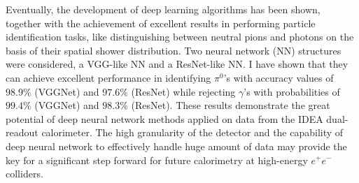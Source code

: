 Eventually, the development of deep learning algorithms has been shown, together with the achievement of excellent results in performing particle identification tasks, like distinguishing between neutral pions and photons on the basis of their spatial shower distribution.
Two neural network (NN) structures were considered, a VGG-like NN and a ResNet-like NN. I have shown that they can achieve excellent performance in identifying $\pi^0$'s with accuracy values of $98.9\%$ (VGGNet) and $97.6\%$ (ResNet) while rejecting $\gamma$'s with probabilities of $99.4\%$ (VGGNet) and $98.3\%$ (ResNet).
These results demonstrate the great potential of deep neural network methods applied on data from the IDEA dual-readout calorimeter. The high granularity of the detector and the capability of deep neural network to effectively handle huge amount of data may provide the key for a significant step forward for future calorimetry at high-energy $e^+ e^-$ colliders.